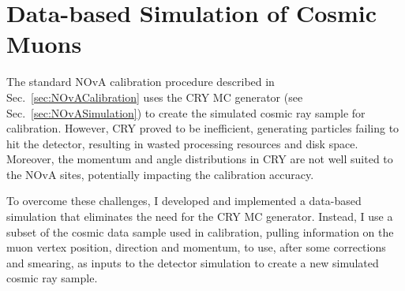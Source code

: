 

\section{Data-based Simulation of Cosmic Muons}\label{sec:DataBasedSimulation}
The standard \gls{NOvA} calibration procedure described in Sec.~\ref{sec:NOvACalibration} uses the \gls{CRY} \gls{MC} generator (see Sec.~\ref{sec:NOvASimulation}) to create the simulated cosmic ray sample for calibration. However, \gls{CRY} proved to be inefficient, generating particles failing to hit the detector, resulting in wasted processing resources and disk space. Moreover, the momentum and angle distributions in \gls{CRY} are not well suited to the \gls{NOvA} sites, potentially impacting the calibration accuracy.

To overcome these challenges, I developed and implemented a data-based simulation that eliminates the need for the \gls{CRY} \gls{MC} generator. Instead, I use a subset of the cosmic data sample used in calibration, pulling information on the muon vertex position, direction and momentum, to use, after some corrections and smearing, as inputs to the detector simulation to create a new simulated cosmic ray sample.

